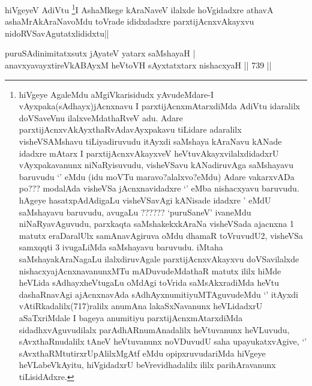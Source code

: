 \begin{artha}
hiVgeyeV AdiVtu \footnote{hiVgeye AgaleMdu aMgiVkarisidudx yAvudeMdare-I vAyxpaka(sAdhayx)jAcnxnavu I parxtijAcnxmAtarxdiMda AdiVtu idaralilx doVSaveVnu ilalxveMdathaRveV adu. Adare parxtijAcnxvAkAyxthaRvAdavAyxpakavu tiLidare adaralilx visheVSAMshavu tiLiyadiruvudu itAyxdi saMshaya kAraNavu kANade idadxre mAtarx I parxtijAcnxvAkayxveV heVtuvAkayxvilalxdidadxrU vAyxpakavanunx niNaRyisuvudu, visheVSavu kANadiruvAga saMshayavu baruvudu `\stext' eMdu (idu moVTu maravo?alalxvo?eMdu) Adare vakarxvADa po??? modalAda visheVSa jAcnxnavidadxre `\stext' eMba nishacxyavu baruvudu. hAgeye hasatxpAdAdigaLu visheVSavAgi kANisade idadxre \stext' eMdU saMshayavu baruvudu, avugaLu ?????? `puruSaneV' ivaneMdu niNaRyavAguvudu, parxkaqta saMshakekxkAraNa visheVSada ajacnxna 1 matutx eraDaralUlx samAnavAgiruva oMdu dhamaR toVruvudU2, visheVSa samxqqti 3 ivugaLiMda saMshayavu baruvudu. iMtaha saMshayakAraNagaLu ilalxdiruvAgale parxtijAcnxvAkayxvu doVSavilalxde nishacxyajAcnxnavanunxMTu mADuvudeMdathaR matutx ililx hiMde heVLida sAdhayxheVtugaLu oMdAgi toVrida saMsAkxradiMda heVtu dashaRnavAgi ajAcnxnavAda sAdhAyxnumitiyuMTAguvudeMdu `\stext' itAyxdi vAtiRkadalilx(717)ralilx anumAna lakaSxNavanunx heVLidadxrU aSaTxriMdale I bageya anumitiyu parxtijAcnxmAtarxdiMda sidadhxvAguvudilalx parAdhARnumAnadalilx heVtuvanunx heVLuvudu, sAvxthaRnudalilx tAneV heVtuvanunx noVDuvudU saha upayukatxvAgive, `\stext' sAvxthaRMtutirxrUpAlilxMgAtf \stext eMdu opipxruvudariMda hiVgeye heVLabeVkAyitu, hiVgidadxrU beVrevidhadalilx ililx parihAravanunx tiLisidAdxre.}I AshaMkege kAraNaveV ilalxde hoVgidadxre athavA ashaMrAkAraNavoMdu toVrade ididxdadxre parxtijAcnxvAkayxvu nidoRVSavAgutatxlididxtu||
\end{artha}


\begin{shl}
puruSAdinimitatxsutx jAyateV yatarx saMshayaH | \\
anavxyavayxtireVkABAyxM heVtoVH sAyxtatxtarx nishacxyaH \hfill||  739 ||  
\end{shl}

